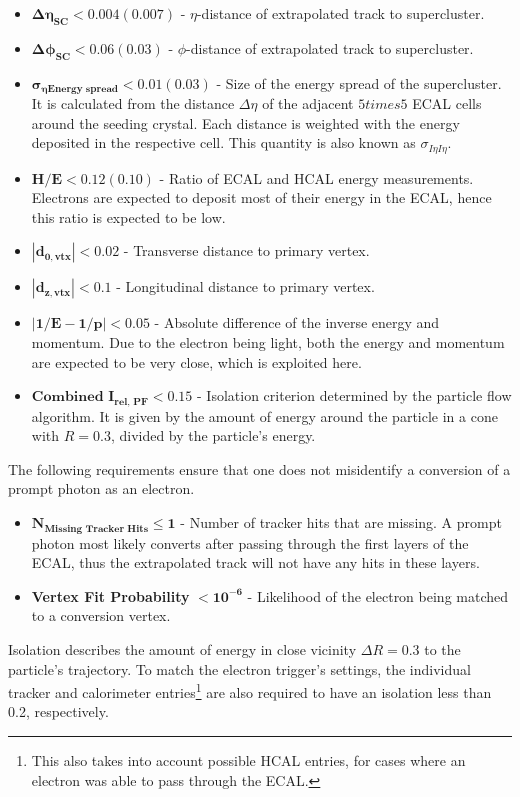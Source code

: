 \begin{itemize}
\item $\mathbf{\Delta \eta_{\textbf{SC}} < 0.004 (0.007)}$ - $\eta$-distance of extrapolated track to supercluster.
\item $\mathbf{\Delta \phi_{\textbf{SC}} < 0.06 (0.03)}$ - $\phi$-distance of extrapolated track to supercluster.
\item $\mathbf{\sigma_{\eta \text{Energy spread}} < 0.01 (0.03)}$ - Size of the energy spread of the supercluster. It is calculated from the distance $\Delta \eta$ of the adjacent $5 times 5$ ECAL cells around the seeding crystal. Each distance is weighted with the energy deposited in the respective cell. This quantity is also known as $\sigma_{I \eta I \eta}$.
\item $\mathbf{H / E < 0.12 (0.10)}$ - Ratio of ECAL and HCAL energy measurements. Electrons are expected to deposit most of their energy in the ECAL, hence this ratio is expected to be low. 
\item $\mathbf{|d_{0, \textbf{vtx}}| < 0.02}$ - Transverse distance to primary vertex.
\item $\mathbf{|d_{z, \textbf{vtx}}| < 0.1}$ - Longitudinal distance to primary vertex.
\item $\mathbf{|1/E - 1/p| < 0.05}$ - Absolute difference of the inverse energy and momentum. Due to the electron being light, both the energy and momentum are expected to be very close, which is exploited here.  
\item $\mathbf{\textbf{Combined I}_{\textbf{rel, PF}} < 0.15}$ - Isolation criterion determined by the particle flow algorithm. It is given by the amount of energy around the particle in a cone with $R = 0.3$, divided by the particle's energy.
\end{itemize}
\noindent The following requirements ensure that one does not misidentify a conversion of a prompt photon as an electron. 
\begin{itemize}
\item $\mathbf{N_{\text{Missing Tracker Hits}} \leq 1}$ - Number of tracker hits that are missing. A prompt photon most likely converts after passing through the first layers of the ECAL, thus the extrapolated track will not have any hits in these layers. 
\item \textbf{Vertex Fit Probability} $\mathbf{< 10^{-6}}$ - Likelihood of the electron being matched to a conversion vertex.
\end{itemize}

Isolation describes the amount of energy in close vicinity $\Delta R = 0.3$ to the particle's trajectory. To match the electron trigger's settings, the individual tracker and calorimeter entries\footnote{This also takes into account possible HCAL entries, for cases where an electron was able to pass through the ECAL.} are also required to have an isolation less than 0.2, respectively.

